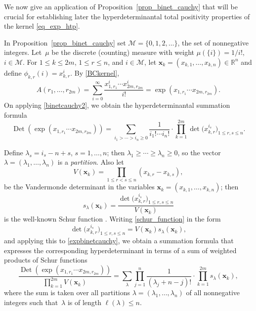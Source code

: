 \documentclass[pdftex]{sigma}
\numberwithin{equation}{section}
\def\R{{\mathbb R}}
\def\Det{\operatorname{Det}}
\def\mcalM{\mathcal{M}}
\def\xx{\boldsymbol{x}}
\begin{document}
We now give an application of Proposition~\ref{prop_binet_cauchy} that will be crucial for establishing later the hyperdeterminantal total positivity properties of the kernel \eqref{eq_exp_htp}.

\begin{Example}
\label{exponentialhyperdet}
In Proposition~\ref{prop_binet_cauchy} set $\mcalM = \{0,1,2,\dots\}$, the set of nonnegative integers. Let~$\mu$ be the discrete (counting) measure with weight $\mu(\{i\}) = 1/i!$, $i \in \mcalM$. For $1 \le k \le 2m$, $1 \le r \le n$, and $i \in \mcalM$, let $\xx_k = (x_{k,1},\dots,x_{k,n}) \in \R^n$ and define $\phi_{k,r}(i) = x_{k,r}^i$. By \eqref{BCkernel},
\[
A(r_1,\dots,r_{2m}) = \sum_{i=0}^\infty \dfrac{x_{1,r_1}^i \cdots x_{2m,r_{2m}}^i}{i!}
= \exp(x_{1,r_1} \cdots x_{2m,r_{2m}}).
\]
On applying \eqref{binetcauchy2}, we obtain the hyperdeterminantal summation formula
\begin{equation}
\Det(\exp(x_{1,r_1} \cdots x_{2m,r_{2m}})) = \sum_{i_1 > \cdots > i_n \ge 0} \frac{1}{i_1! \cdots i_n!} \cdot \prod_{k=1}^{2m} \det\bigl(x_{k,r}^{i_s}\bigr)_{1 \le r,s\le n}.\label{expbinetcauchy}
\end{equation}

Define $\lambda_s = i_s - n + s$, $s=1,\dots,n$; then $\lambda_1 \ge \cdots \ge \lambda_n \ge 0$, so the vector $\lambda = (\lambda_1,\dots,\lambda_n)$ is a {\it partition}. Also let
\begin{equation}
V(\xx_k) = \prod_{1 \le r < s \le n} (x_{k,r} - x_{k,s}),\label{eq_vandermonde}
\end{equation}
be the Vandermonde determinant in the variables $\xx_k = (x_{k,1},\dots,x_{k,n})$; then
\begin{equation}
s_\lambda(\xx_k) = \frac{\det\bigl(x_{k,r}^{i_s}\bigr)_{1 \le r,s\le n}}{V(\xx_k)}\label{schur_function}
\end{equation}
is the well-known Schur function \cite[p.~40]{macdonald}. Writing \eqref{schur_function} in the form
\begin{equation}
\det\bigl(x_{k,r}^{i_s}\bigr)_{1 \le r,s\le n} = V(\xx_k) s_\lambda(\xx_k),\label{schurhyperdet}
\end{equation}
and applying this to \eqref{expbinetcauchy}, we obtain a summation formula that expresses the corresponding hyperdeterminant in terms of a sum of weighted products of Schur functions
\begin{equation}
\frac{\Det(\exp(x_{1,r_1} \cdots x_{2m,r_{2m}}))}{\prod_{k=1}^{2m} V(\xx_k)} = \sum_\lambda \prod_{j=1}^n \frac{1}{(\lambda_j + n-j)!} \cdot \prod_{k=1}^{2m} s_\lambda(\xx_k),\label{schurhyperdetsum}
\end{equation}
where the sum is taken over all partitions $\lambda = (\lambda_1,\dots,\lambda_n)$ of all nonnegative integers such that~$\lambda$ is of length $\ell(\lambda) \le n$.
\end{Example}
\end{document}
